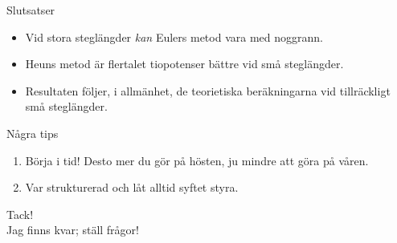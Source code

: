 \documentclass[12pt, aspectratio=169, xcolor={dvipsnames,svgnames}]{beamer}
\begin{document}
\begin{frame}{Slutsatser}
    \begin{itemize}[<+- | alert@+>]
        
        \item Vid stora steglängder \emph{kan} Eulers metod vara med noggrann.
        \item Heuns metod är flertalet tiopotenser bättre vid små steglängder.
        \item Resultaten följer, i allmänhet, de teorietiska beräkningarna vid tillräckligt små steglängder.
  \end{itemize}
\end{frame}

\begin{frame}{Några tips}
    \begin{enumerate}[<+- | alert@+>]
    
        \item Börja i tid! Desto mer du gör på hösten, ju mindre att göra på våren.
        \item Var strukturerad och låt alltid syftet styra.
    \end{enumerate}
\end{frame}

\begin{frame}[standout]
    Tack!\\[0.3em]
    \textnormal{Jag finns kvar; ställ frågor!}
\end{frame}
\end{document}
